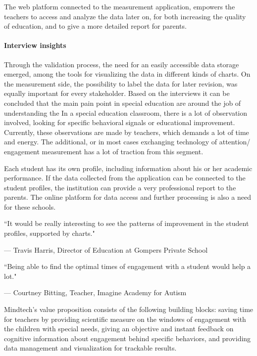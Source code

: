\documentclass[letterpaper,10pt]{article}
\begin{document}
The web platform connected to the measurement application,  empowers the teachers to access and analyze the data later on, for both increasing the quality of education, and to give a more detailed report for parents. 


\paragraph{Interview insights}

Through the validation process, the need for an easily accessible data storage emerged, among the tools for visualizing the data in different kinds of charts. On the measurement side, the possibility to label the data for later revision, was equally important for every stakeholder. Based on the interviews it can be concluded that the main pain point in special education are around the job of understanding the  In a special education classroom, there is a lot of observation involved, looking for specific behavioral signals or educational improvement. Currently, these observations are made by teachers, which demands a lot of time and energy. The additional, or in most cases exchanging technology of attention/ engagement measurement has a lot of traction from this segment. 

Each student has its own profile, including information about his or her academic performance. If the data collected from the application can be connected to the student profiles, the institution can provide a very professional report to the parents. The online platform for data access and further processing is also a need for these schools.


\textcolor{myblue}{\epigraph{``It would be really interesting to see the patterns of improvement in the student profiles, supported by charts."}{--- \textup{Travis Harris},  Director of Education at Gompers Private School}}

\textcolor{myblue}{\epigraph{``Being able to find the optimal times of engagement with a student would help a lot."}{--- \textup{Courtney Bitting},  Teacher, Imagine Academy for Autism}}


Mindtech's value proposition consists of the following building blocks: saving time for teachers by providing scientific measure on the windows of engagement with the children with special needs, giving an objective and instant feedback on cognitive information about engagement behind specific behaviors, and providing data management and visualization for trackable results.
\end{document}
